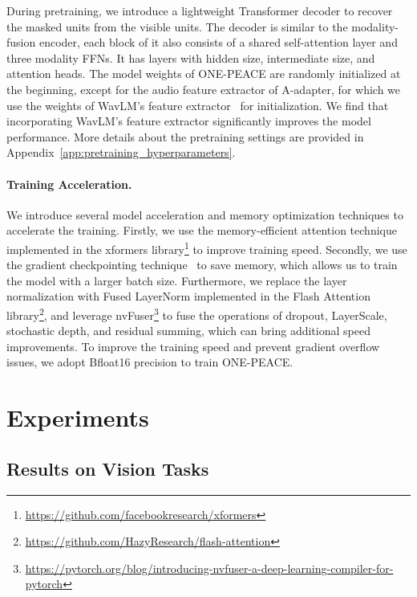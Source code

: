\documentclass{article}
\newcommand{\onepeace}{ONE-PEACE\xspace}
\begin{document}
During pretraining, we introduce a lightweight Transformer decoder to recover the masked units from the visible units. The decoder is similar to the modality-fusion encoder, each block of it also consists of a shared self-attention layer and three modality FFNs.
It has  layers with  hidden size,  intermediate size, and  attention heads.
The model weights of \onepeace are randomly initialized at the beginning, except for the audio feature extractor of A-adapter, for which we use the weights of WavLM's feature extractor~\cite{wavlm} for initialization. 
We find that incorporating WavLM's feature extractor significantly improves the model performance.
More details about the pretraining settings are provided in Appendix~\ref{app:pretraining_hyperparameters}.

\paragraph{Training Acceleration.}
We introduce several model acceleration and memory optimization techniques to accelerate the training.
Firstly, we use the memory-efficient attention technique~\cite{memory_efficient_attn,flash_attn} implemented in the xformers library\footnote{\url{https://github.com/facebookresearch/xformers}} to improve training speed.
Secondly, we use the gradient checkpointing technique~\cite{checkpointing} to save memory, which allows us to train the model with a larger batch size.
Furthermore, we replace the layer normalization with Fused LayerNorm implemented in the Flash Attention library\footnote{\url{https://github.com/HazyResearch/flash-attention}}, and leverage nvFuser\footnote{\url{https://pytorch.org/blog/introducing-nvfuser-a-deep-learning-compiler-for-pytorch}} to fuse the operations of dropout, LayerScale, stochastic depth, and residual summing, which can bring additional speed improvements.
To improve the training speed and prevent gradient overflow issues, we adopt Bfloat16 precision to train \onepeace. \section{Experiments}
\label{sec:experiments}

\subsection{Results on Vision Tasks}
\end{document}
